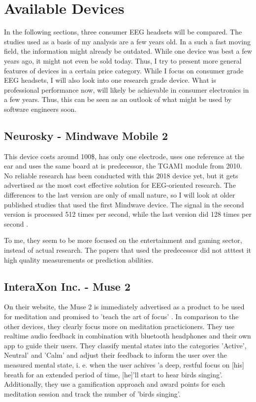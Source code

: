 \documentclass{llncs} %
\begin{document}
\section{Available Devices}
In the following sections, three consumer EEG headsets will be compared. The studies used as a basis of my analysis are a few years old. In a such a fast moving field, the information might already be outdated. While one device was best a few years ago, it might not even be sold today. Thus, I try to present more general features of devices in a certain price category. While I focus on consumer grade EEG headsets, I will also look into one research grade device. What is professional performance now, will likely be achievable in consumer electronics in a few years. Thus, this can be seen as an outlook of what might be used by software engineers soon.
\subsection{Neurosky - Mindwave Mobile 2}
This device costs around 100\$, has only one electrode, uses one reference at the ear and uses the same board at is predecessor, the TGAM1 module from 2010. No reliable research has been conducted with this 2018 device yet, but it gets advertised as the most cost effective solution for EEG-oriented research. The differences to the last version are only of small nature, so I will look at older published studies that used the first Mindwave device. The signal in the second version is processed 512 times per second, while the last version did 128 times per second \cite{Maskeliunas}\cite{Mindwave1}\cite{Mindwave2}. 
\medskip

To me, they seem to be more focused on the entertainment and gaming sector, instead of actual research.  The papers that used the predecessor did not atttest it high quality measurements or prediction abilities. 
\subsection{InteraXon Inc. - Muse 2}
On their website, the Muse 2 is immediately advertised as a product to be used for meditation and promised to 'teach the art of focus' \cite{Muse}. In comparison to the other devices, they clearly focus more on meditation practicioners. They use realtime audio feedback in combination with bluetooth headphones and their own app to guide their users. They classify mental states into the categories 'Active', Neutral' and 'Calm' and adjust their feedback to inform the user over the measured mental state, i. e. when the user achives 'a deep, restful focus on [his] breath for an extended period of time, [he]'ll start to hear birds singing'. Additionally, they use a gamification approach and award points for each meditation session and track the number of 'birds singing'. 
\medskip
\end{document}
